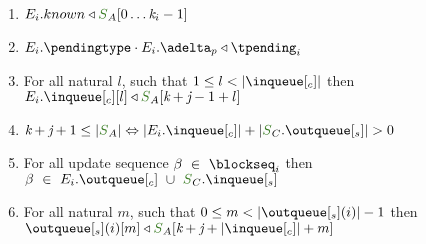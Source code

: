 \documentclass[envcountsect,runningheads,orivec]{llncs}
\begin{document}
\begin{theorem}
\begin{enumerate}
	\item $E_{i}.known \triangleleft \queuemessage_A[0 \ldots \tknown_i - 1]$
	\item $E_{i}.\pending \cdot E_{i}.\pushbuffer \triangleleft \tpending_i$
	\item For all natural $l$, such that $1 \leq l < |\inclient|$ then $E_{i}.\inclient[l] \triangleleft \queuemessage_A[\tknown + \treceivebuffer - 1 +l]$
	\item $\tknown + \treceivebuffer + 1 \leq |\queuemessage_A| \Leftrightarrow |E_{i}.\inclient| + |\queuemessage_C.\outserver| > 0$
	\item For all update sequence $\beta \ \in \ \tsent_i$ then $\beta \ \in \ E_{i}.\outclient \ \cup \ \queuemessage_C.\inserver$
		\item For all natural $m$, such that $0 \leq m < |\outserver(i)| - 1$ then $\outserver(i)[m] \triangleleft \queuemessage_A[\tknown + \treceivebuffer + |\inclient| + m]$

		

\end{enumerate}
\end{theorem}
\end{document}
